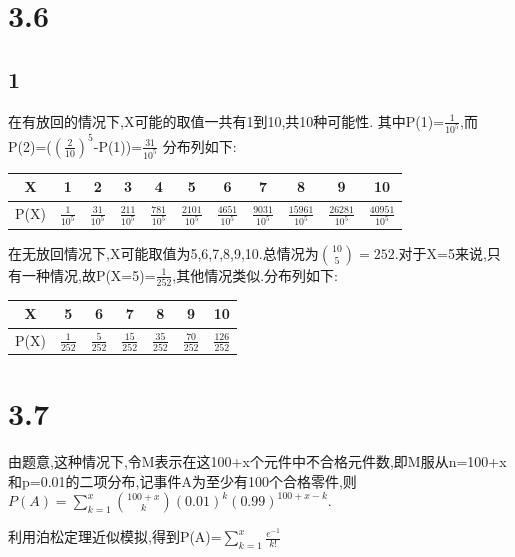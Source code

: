 \documentclass[12pt,a4paper,fontset=none]{ctexart}
\begin{document}
\section*{3.6}
\subsection*{1}
在有放回的情况下,X可能的取值一共有1到10,共10种可能性.
其中P(1)=$\frac{1}{10^5} $,而P(2)=($(\frac{2}{10})^5$-P(1))=$\frac{31}{10^5} $
分布列如下:
\begin{center}
	\begin{tabular}{|c|c|c|c|c|c|c|c|c|c|c|}
		\hline
		X    & 1                 & 2                  & 3                   & 4                   & 5                    & 6                    & 7                    & 8                     & 9                     & 10                    \\
		\hline
		P(X) & $\frac{1}{10^5} $ & $\frac{31}{10^5} $ & $\frac{211}{10^5} $ & $\frac{781}{10^5} $ & $\frac{2101}{10^5} $ & $\frac{4651}{10^5} $ & $\frac{9031}{10^5} $ & $\frac{15961}{10^5} $ & $\frac{26281}{10^5} $ & $\frac{40951}{10^5} $ \\
		\hline
	\end{tabular}
\end{center}

在无放回情况下,X可能取值为5,6,7,8,9,10.总情况为$\binom{10}{5}=252$.对于X=5来说,只有一种情况,故P(X=5)=$\frac{1}{252} $,其他情况类似.分布列如下:

\begin{center}
	\begin{tabular}{|c|c|c|c|c|c|c|}
		\hline
		X    & 5                & 6                & 7                 & 8                 & 9                 & 10                 \\
		\hline
		P(X) & $\frac{1}{252} $ & $\frac{5}{252} $ & $\frac{15}{252} $ & $\frac{35}{252} $ & $\frac{70}{252} $ & $\frac{126}{252} $ \\
		\hline
	\end{tabular}
\end{center}

\section*{3.7}
由题意,这种情况下,令M表示在这100+x个元件中不合格元件数,即M服从n=100+x和p=0.01的二项分布,记事件A为至少有100个合格零件,则$P(A)=\sum_{k=1}^{x}\binom{100+x}{k}(0.01)^k(0.99)^{100+x-k}$.

利用泊松定理近似模拟,得到P(A)=$\sum_{k=1}^{x}\frac{e^{-1}}{k!} $
\end{document}
